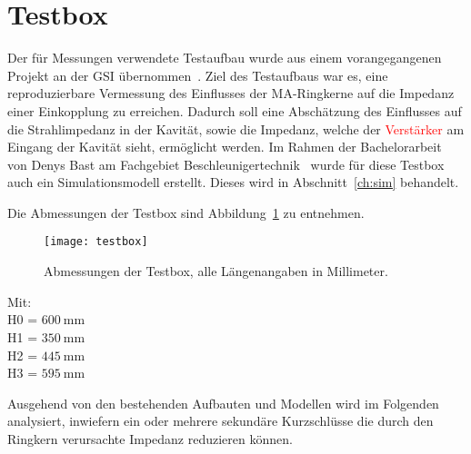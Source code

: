 \section{Testbox}
\label{sec:testbox}
Der f\"ur Messungen verwendete Testaufbau wurde aus einem vorangegangenen Projekt an der GSI \"ubernommen~\citep{harzheim2016modeling}. Ziel des Testaufbaus war es, eine reproduzierbare Vermessung des Einflusses der MA-Ringkerne auf die Impedanz einer Einkopplung zu erreichen. Dadurch soll eine Absch\"atzung des Einflusses auf die Strahlimpedanz in der Kavit\"at, sowie die Impedanz, welche der \textcolor{red}{Verst\"arker} am Eingang der Kavit\"at sieht, erm\"oglicht werden. Im Rahmen der Bachelorarbeit von Denys Bast am Fachgebiet Beschleunigertechnik~\citep{bast2017ba} wurde f\"ur diese Testbox auch ein Simulationsmodell erstellt. Dieses wird in Abschnitt~\ref{ch:sim} behandelt. 
\par
Die Abmessungen der Testbox sind Abbildung~\ref{fig:boxdimensions} zu entnehmen.
\par
\begin{figure}[htb]
	\centering
	\texttt{[image: testbox]}
	\caption{Abmessungen der Testbox, alle L\"angenangaben in Millimeter.}
	\label{fig:boxdimensions}
\end{figure}
Mit:\\
H0 = $\SI{600}{\milli\meter}$\\
H1 = $\SI{350}{\milli\meter}$\\
H2 = $\SI{445}{\milli\meter}$\\
H3 = $\SI{595}{\milli\meter}$


\par
Ausgehend von den bestehenden Aufbauten und Modellen wird im Folgenden analysiert, inwiefern ein oder mehrere sekund\"are Kurzschl\"usse die durch den Ringkern verursachte Impedanz reduzieren k\"onnen. 


\newpage


